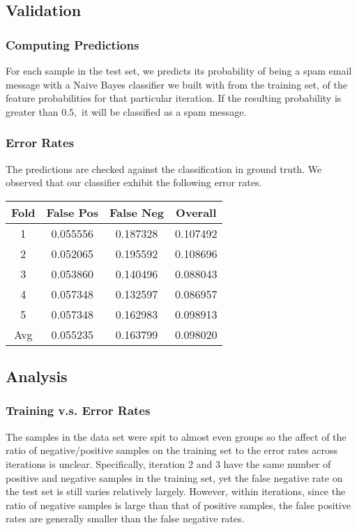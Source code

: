 \documentclass[letterpaper]{article}
\begin{document}
\subsection{Validation}
\subsubsection{Computing Predictions}
For each sample in the test set, we predicts its probability of being a spam email message with a Naive Bayes classifier we built with from the training set, of the feature probabilities for that particular iteration. If the resulting probability is greater than $0.5,$ it will be classified as a spam message.
\subsubsection{Error Rates}
The predictions are checked against the classification in ground truth. We observed that our classifier exhibit the following error rates.
\begin{center}
\begin{tabular}{|c|c|c|c|}
\hline
\textbf{Fold} & \textbf{False Pos} & \textbf{False Neg} & \textbf{Overall} \\ \hline
1             & 0.055556           & 0.187328           & 0.107492         \\ \hline
2             & 0.052065           & 0.195592           & 0.108696         \\ \hline
3             & 0.053860           & 0.140496           & 0.088043         \\ \hline
4             & 0.057348           & 0.132597           & 0.086957         \\ \hline
5             & 0.057348           & 0.162983           & 0.098913         \\ \hline
Avg           & 0.055235           & 0.163799           & 0.098020         \\ \hline
\end{tabular}
\end{center}
\subsection{Analysis}
\subsubsection{Training v.s. Error Rates}
The samples in the data set were spit to almost even groups so the affect of the ratio of negative/positive samples on the training set to the error rates across iterations is unclear. Specifically, iteration 2 and 3 have the same number of positive and negative samples in the training set, yet the false negative rate on the test set is still varies relatively largely. However, within iterations, since the ratio of negative samples is large than that of positive samples, the false positive rates are generally smaller than the false negative rates. 
\end{document}
